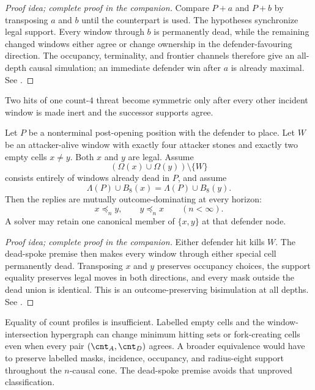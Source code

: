 \begin{proof}[Proof idea; complete proof in the companion]
Compare $P+a$ and $P+b$ by transposing $a$ and $b$ until the counterpart is
used.  The hypotheses synchronize legal support.  Every window through $b$
is permanently dead, while the remaining changed windows either agree or
change ownership in the defender-favouring direction.  The occupancy,
terminality, and frontier channels therefore give an all-depth causal
simulation; an immediate defender win after $a$ is already maximal.  See
\cite{hexobot-companions}.
\end{proof}

Two hits of one count-$4$ threat become symmetric only after every other
incident window is made inert and the successor supports agree.

\begin{proposition}
\label{prop:Dom-P2}
Let $P$ be a nonterminal post-opening position with the defender to place.
Let $W$ be an attacker-alive window with exactly four attacker stones and
exactly two empty cells $x\ne y$.  Both $x$ and $y$ are legal.  Assume
\[
  (\Omega(x)\cup\Omega(y))\setminus\{W\}
\]
consists entirely of windows already dead in $P$, and assume
\[
  \Lambda(P)\cup B_8(x)=\Lambda(P)\cup B_8(y).
\]
Then the replies are mutually outcome-dominating at every horizon:
\[
  x\preceq_n y,
  \qquad
  y\preceq_n x
  \qquad(n<\infty).
\]
A solver may retain one canonical member of $\{x,y\}$ at that defender node.
\end{proposition}

\begin{proof}[Proof idea; complete proof in the companion]
Either defender hit kills $W$.  The dead-spoke premise then makes every window
through either special cell permanently dead.  Transposing $x$ and $y$
preserves occupancy choices, the support equality preserves legal moves in
both directions, and every mask outside the dead union is identical.  This is
an outcome-preserving bisimulation at all depths.  See
\cite{hexobot-companions}.
\end{proof}

Equality of count profiles is insufficient.  Labelled empty cells and the
window-intersection hypergraph can change minimum hitting sets or
fork-creating cells even when every pair $(\cnt_A,\cnt_D)$ agrees.  A broader
equivalence would have to preserve labelled masks, incidence, occupancy, and
radius-eight support throughout the $n$-causal cone.  The dead-spoke premise
avoids that unproved classification.

